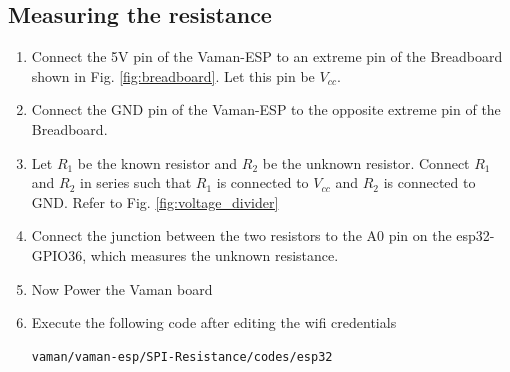 \subsection{Measuring the resistance}
\begin{enumerate}[label=\thesection.\arabic*.,ref=\thesection.\theenumi]

\item
Connect the 5V pin of the Vaman-ESP to an extreme pin of the Breadboard shown in Fig. \ref{fig:breadboard}.  Let this pin be $V_{cc}$.
\item
Connect the GND pin of the Vaman-ESP to the opposite extreme pin of the Breadboard.

%
%
\item
Let $R_1$ be the known resistor and $R_2$ be the unknown resistor.  Connect $R_1$ and $R_2$ in series such that $R_1$ is connected
to $V_{cc}$ and $R_2$ is connected to GND. Refer to Fig. \ref{fig:voltage_divider}
\item
Connect the junction between the two resistors to  the A0 pin on the esp32-GPIO36, which measures the  unknown resistance.
\item
Now Power the Vaman board
\item
Execute the following code after editing the wifi credentials
\begin{lstlisting}
vaman/vaman-esp/SPI-Resistance/codes/esp32
\end{lstlisting}
\end{enumerate}
